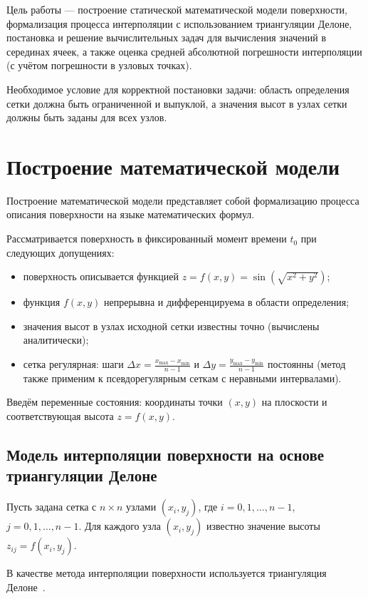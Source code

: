 \documentclass[a4paper, 14pt]{extarticle}
\begin{document}
Цель работы --- построение статической математической модели поверхности, формализация процесса интерполяции с использованием триангуляции Делоне, постановка и решение вычислительных задач для вычисления значений в серединах ячеек, а также оценка средней абсолютной погрешности интерполяции (с учётом погрешности в узловых точках).

Необходимое условие для корректной постановки задачи: область определения сетки должна быть ограниченной и выпуклой, а значения высот в узлах сетки должны быть заданы для всех узлов.

\section{Построение математической модели}
Построение математической модели представляет собой формализацию процесса описания поверхности на языке математических формул.

Рассматривается поверхность в фиксированный момент времени $t_0$ при следующих допущениях:
\begin{itemize}
  \item поверхность описывается функцией $z = f(x, y) = \sin\!\left(\sqrt{x^2 + y^2}\right)$;
  \item функция $f(x, y)$ непрерывна и дифференцируема в области определения;
  \item значения высот в узлах исходной сетки известны точно (вычислены аналитически);
  \item сетка регулярная: шаги $\Delta x = \frac{x_{\max} - x_{\min}}{n - 1}$ и $\Delta y = \frac{y_{\max} - y_{\min}}{n - 1}$ постоянны (метод также применим к псевдорегулярным сеткам с неравными интервалами).
\end{itemize}

Введём переменные состояния: координаты точки $(x, y)$ на плоскости и соответствующая высота $z = f(x, y)$.

\subsection{Модель интерполяции поверхности на основе триангуляции Делоне}

Пусть задана сетка с $n \times n$ узлами $(x_i, y_j)$, где $i = 0, 1, \ldots, n-1$, $j = 0, 1, \ldots, n-1$. Для каждого узла $(x_i, y_j)$ известно значение высоты $z_{ij} = f(x_i, y_j)$.

В качестве метода интерполяции поверхности используется триангуляция Делоне~\cite{skvortsov2002, deberg2004}.
\end{document}

